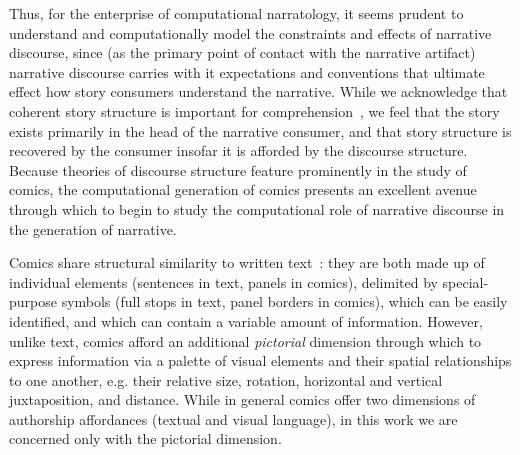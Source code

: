 Thus, for the enterprise of computational narratology, it seems prudent to
understand and computationally model the constraints and effects of narrative
discourse, since (as the primary point of contact with the narrative artifact)
narrative discourse carries with it expectations and conventions that ultimate
effect how story consumers understand the narrative. While we acknowledge that
coherent story structure is important for comprehension~\cite{graesser2002how},
we feel that the story exists primarily in the head of the narrative consumer,
and that story structure is recovered by the consumer insofar it is afforded by
the discourse structure. Because theories of discourse structure feature
prominently in the study of comics, the computational generation
of comics presents an excellent avenue through which to begin to study the
computational role of narrative discourse in the generation of narrative.

Comics share structural similarity to written
text~\cite{saraceni2016relatedness}: they are both made up of individual
elements (sentences in text, panels in comics), delimited by special-purpose
symbols (full stops in text, panel borders in comics), which can be easily
identified, and which can contain a variable amount of information. However,
unlike text, comics afford an additional \emph{pictorial} dimension through
which to express information via a palette of visual elements and their spatial
relationships to one another, e.g. their relative size, rotation, horizontal and
vertical juxtaposition, and distance. While in general comics offer two
dimensions of authorship affordances (textual and visual language), in this work
we are concerned only with the pictorial dimension.

